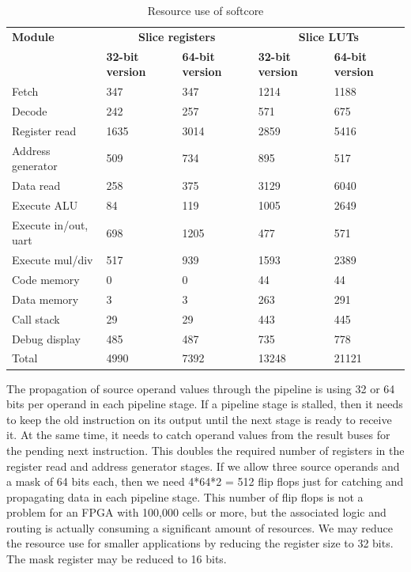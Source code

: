 \documentclass[11pt,a4paper,oneside,openright]{report}
\newcommand{\vv}{ \vspace{2mm} }   %
\begin{document}
\begin{table}[h]
\begin{tabular}{|l|l|l|l|l|} 
\hline
\bfseries Module & \multicolumn{2}{|c|}{\bfseries Slice registers} & \multicolumn{2}{c|}{\bfseries Slice LUTs}  \\
\bfseries  & \bfseries 32-bit version & \bfseries 64-bit version & \bfseries 32-bit version & \bfseries 64-bit version  \\ \hline
Fetch                &  347  &  347  &  1214 &  1188 \\ \hline
Decode               & 242   &  257  &   571 &   675 \\ \hline
Register read        & 1635  & 3014  &  2859 &  5416 \\ \hline
Address generator    & 509   &  734  &   895 &   517 \\ \hline
Data read            & 258   &  375  &  3129 &  6040 \\ \hline
Execute ALU          & 84    &  119  &  1005 &  2649 \\ \hline
Execute in/out, uart & 698   & 1205  &   477 &   571 \\ \hline
Execute mul/div      & 517   &  939  &  1593 &  2389 \\ \hline
Code memory          & 0     &    0  &    44 &    44 \\ \hline
Data memory          & 3     &    3  &   263 &   291 \\ \hline
Call stack           & 29    &   29  &   443 &   445 \\ \hline
Debug display        & 485   &  487  &   735 &   778 \\ \hline
Total                & 4990  & 7392  & 13248 & 21121 \\ \hline
\end{tabular}
\caption{Resource use of softcore}
\label{table:ResourceUse}
\end{table}
\vv

The propagation of source operand values through the pipeline is using 32 or 64 bits per operand in each pipeline stage. If a pipeline stage is stalled, then it needs to keep the old instruction on its output until the next stage is ready to receive it. At the same time, it needs to catch operand values from the result buses for the pending next instruction. This doubles the required number of registers in the register read and address generator stages. If we allow three source operands and a mask of 64 bits each, then we need 4*64*2 = 512 flip flops just for catching and propagating data in each pipeline stage. This number of flip flops is not a problem for an FPGA with 100,000 cells or more, but the associated logic and routing is actually consuming a significant amount of resources. We may reduce the resource use for smaller applications by reducing the register size to 32 bits. The mask register may be reduced to 16 bits.
\vv
\end{document}
